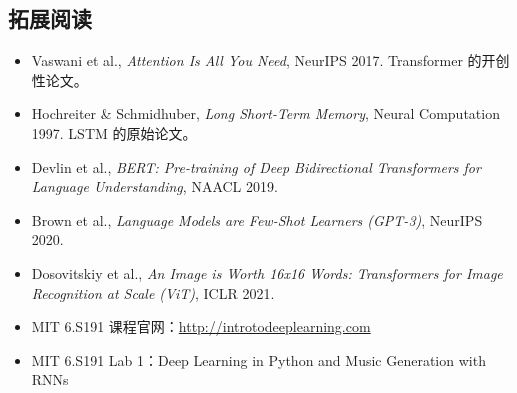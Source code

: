 \documentclass[a4paper]{article}
\begin{document}
\subsection{拓展阅读}

\begin{itemize}
    \item Vaswani et al., \textit{Attention Is All You Need}, NeurIPS 2017. Transformer 的开创性论文。
    \item Hochreiter \& Schmidhuber, \textit{Long Short-Term Memory}, Neural Computation 1997. LSTM 的原始论文。
    \item Devlin et al., \textit{BERT: Pre-training of Deep Bidirectional Transformers for Language Understanding}, NAACL 2019.
    \item Brown et al., \textit{Language Models are Few-Shot Learners (GPT-3)}, NeurIPS 2020.
    \item Dosovitskiy et al., \textit{An Image is Worth 16x16 Words: Transformers for Image Recognition at Scale (ViT)}, ICLR 2021.
    \item MIT 6.S191 课程官网：\url{http://introtodeeplearning.com}
    \item MIT 6.S191 Lab 1：Deep Learning in Python and Music Generation with RNNs
\end{itemize}

\end{document}
